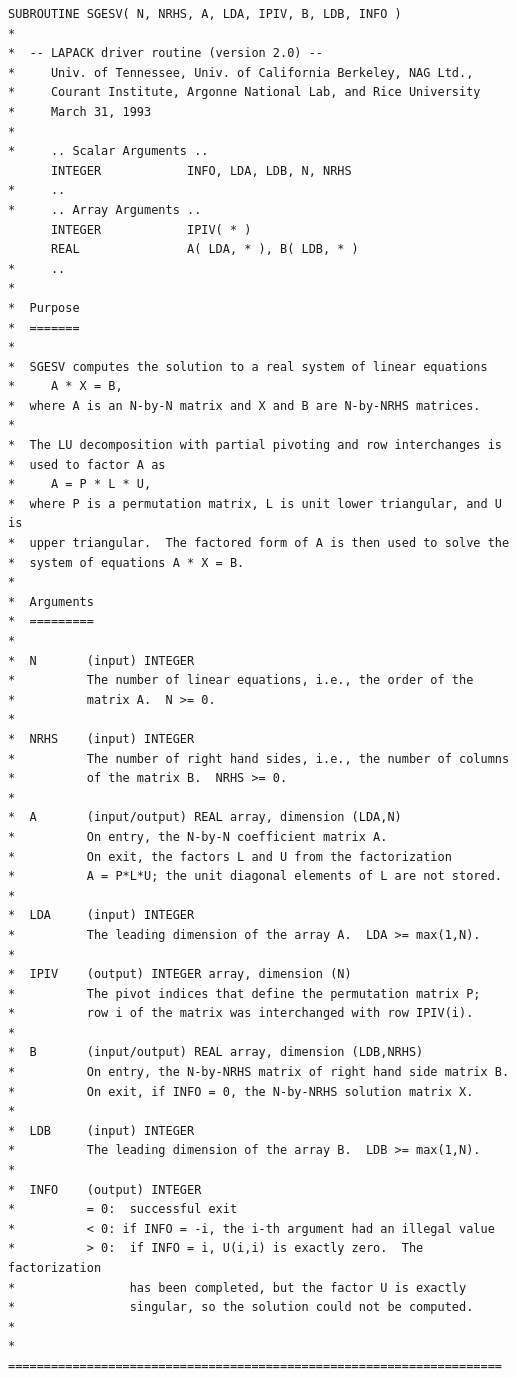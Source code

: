 \begin{lstlisting}[style=fortran77]
      SUBROUTINE SGESV( N, NRHS, A, LDA, IPIV, B, LDB, INFO )
*
*  -- LAPACK driver routine (version 2.0) --
*     Univ. of Tennessee, Univ. of California Berkeley, NAG Ltd.,
*     Courant Institute, Argonne National Lab, and Rice University
*     March 31, 1993 
*
*     .. Scalar Arguments ..
      INTEGER            INFO, LDA, LDB, N, NRHS
*     ..
*     .. Array Arguments ..
      INTEGER            IPIV( * )
      REAL               A( LDA, * ), B( LDB, * )
*     ..
*
*  Purpose
*  =======
*
*  SGESV computes the solution to a real system of linear equations
*     A * X = B,
*  where A is an N-by-N matrix and X and B are N-by-NRHS matrices.
*
*  The LU decomposition with partial pivoting and row interchanges is
*  used to factor A as
*     A = P * L * U,
*  where P is a permutation matrix, L is unit lower triangular, and U is
*  upper triangular.  The factored form of A is then used to solve the
*  system of equations A * X = B.
*
*  Arguments
*  =========
*
*  N       (input) INTEGER
*          The number of linear equations, i.e., the order of the
*          matrix A.  N >= 0.
*
*  NRHS    (input) INTEGER
*          The number of right hand sides, i.e., the number of columns
*          of the matrix B.  NRHS >= 0.
*
*  A       (input/output) REAL array, dimension (LDA,N)
*          On entry, the N-by-N coefficient matrix A.
*          On exit, the factors L and U from the factorization
*          A = P*L*U; the unit diagonal elements of L are not stored.
*
*  LDA     (input) INTEGER
*          The leading dimension of the array A.  LDA >= max(1,N).
*
*  IPIV    (output) INTEGER array, dimension (N)
*          The pivot indices that define the permutation matrix P;
*          row i of the matrix was interchanged with row IPIV(i).
*
*  B       (input/output) REAL array, dimension (LDB,NRHS)
*          On entry, the N-by-NRHS matrix of right hand side matrix B.
*          On exit, if INFO = 0, the N-by-NRHS solution matrix X.
*
*  LDB     (input) INTEGER
*          The leading dimension of the array B.  LDB >= max(1,N).
*
*  INFO    (output) INTEGER
*          = 0:  successful exit
*          < 0: if INFO = -i, the i-th argument had an illegal value
*          > 0:  if INFO = i, U(i,i) is exactly zero.  The factorization
*                has been completed, but the factor U is exactly
*                singular, so the solution could not be computed.
*
*  =====================================================================
\end{lstlisting}

